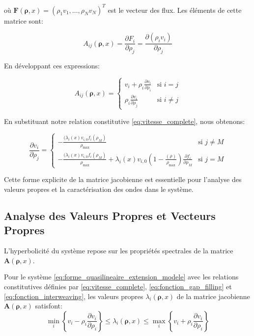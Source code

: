 où $\mathbf{F}(\boldsymbol{\rho}, x) = (\rho_1 v_1, \ldots, \rho_N v_N)^T$ est le vecteur des flux. Les éléments de cette matrice sont:

\begin{equation}
A_{ij}(\boldsymbol{\rho}, x) = \frac{\partial F_i}{\partial \rho_j} = \frac{\partial (\rho_i v_i)}{\partial \rho_j}
\end{equation}

En développant ces expressions:

\begin{equation}
A_{ij}(\boldsymbol{\rho}, x) = 
\begin{cases}
v_i + \rho_i \frac{\partial v_i}{\partial \rho_i} & \text{si } i = j \\
\rho_i \frac{\partial v_i}{\partial \rho_j} & \text{si } i \neq j
\end{cases}
\end{equation}

En substituant notre relation constitutive \eqref{eq:vitesse_complete}, nous obtenons:

\begin{equation}
\frac{\partial v_i}{\partial \rho_j} = 
\begin{cases}
-\frac{(\lambda_i(x) v_{i,0} f_i(\rho_M)}{\rho_{\max}} & \text{si } j \neq M \\
-\frac{(\lambda_i(x) v_{i,0} f_i(\rho_M)}{\rho_{\max}} + \lambda_i(x) v_{i,0} \left(1 - \frac{(\rho)}{\rho_{\max}}\right) \frac{\partial f_i}{\partial \rho_M} & \text{si } j = M
\end{cases}
\end{equation}

Cette forme explicite de la matrice jacobienne est essentielle pour l'analyse des valeurs propres et la caractérisation des ondes dans le système.

\subsection{Analyse des Valeurs Propres et Vecteurs Propres}
\label{subsec:valeurs_propres}

L'hyperbolicité du système repose sur les propriétés spectrales de la matrice $\mathbf{A}(\boldsymbol{\rho}, x)$.

\begin{theorem}
Pour le système \eqref{eq:forme_quasilineaire_extension_modele} avec les relations constitutives définies par \eqref{eq:vitesse_complete}, \eqref{eq:fonction_gap_filling} et \eqref{eq:fonction_interweaving}, les valeurs propres $\lambda_i(\boldsymbol{\rho}, x)$ de la matrice jacobienne $\mathbf{A}(\boldsymbol{\rho}, x)$ satisfont:
\begin{equation}
 \min_{i} \left\{v_i - \rho_i \frac{\partial v_i}{\partial \rho_i}\right\} \leq \lambda_i(\boldsymbol{\rho}, x) \leq \max_{i} \left\{v_i + \rho_i \frac{\partial v_i}{\partial \rho_i}\right\}
\end{equation}

\end{theorem}

